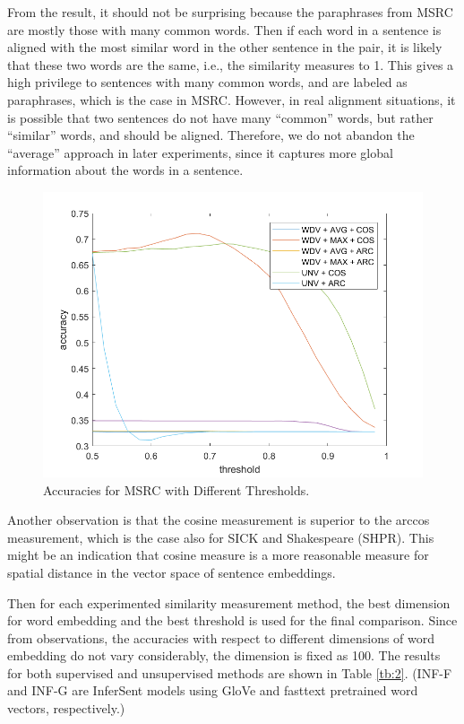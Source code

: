 \documentclass[runningheads]{llncs}
\begin{document}
From the result, it should not be surprising because the paraphrases from MSRC are mostly those with many common words. Then if each word in a sentence is aligned with the most similar word in the other sentence in the pair, it is likely that these two words are the same, i.e., the similarity measures to 1. This gives a high privilege to sentences with many common words, and are labeled as paraphrases, which is the case in MSRC. However, in real alignment situations, it is possible that two sentences do not have many ``common'' words, but rather ``similar'' words, and should be aligned. Therefore, we do not abandon the ``average'' approach in later experiments, since it captures more global information about the words in a sentence.
\begin{figure}[htbp]
	\centering
	\includegraphics[width=12cm]{./5.png}
	\caption{Accuracies for MSRC with Different Thresholds.}\label{fig:5}
\end{figure}

Another observation is that the cosine measurement is superior to the arccos measurement, which is the case also for SICK and Shakespeare (SHPR). This might be an indication that cosine measure is a more reasonable measure for spatial distance in the vector space of sentence embeddings.

Then for each experimented similarity measurement method, the best dimension for word embedding and the best threshold is used for the final comparison. Since from observations, the accuracies with respect to different dimensions of word embedding do not vary considerably, the dimension is fixed as 100. The results for both supervised and unsupervised methods are shown in Table \ref{tb:2}. (INF-F and INF-G are InferSent models using GloVe and fasttext pretrained word vectors, respectively.)
\end{document}
